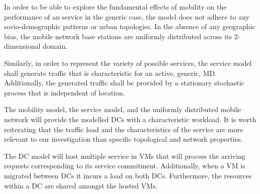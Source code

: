 In order to be able to explore the fundamental effects of mobility on the performance of an \xcloud{} service in the generic case, the model does not adhere to any socio-demographic patterns or urban topologies. In the absence of any geographic bias, the mobile network base stations are uniformly distributed across its 2-dimensional domain.

Similarly, in order to represent the variety of possible services, the service model shall generate traffic that is characteristic for an active, generic, \ac{MD}. Additionally, the generated traffic shall be provided by a stationary stochastic process that is independent of location.

The mobility model, the service model, and the uniformly distributed mobile network will provide the modelled \ac{DC}s with a characteristic workload. It is worth reiterating that the traffic load and the characteristics of the service are more relevant to our investigation than specific topological and network properties.

The \ac{DC} model will host multiple service in VMs that will process the arriving requests corresponding to its service commitment. Additionally, when a VM is migrated between \ac{DC}s it incurs a load on both \ac{DC}s. Furthermore, the resources within a \ac{DC} are shared amongst the hosted VMs. %
